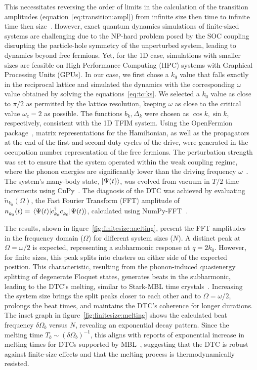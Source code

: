 \documentclass[preprint,5p,times,twocolumn]{elsarticle}
\begin{document}
This necessitates reversing the order of limits in the calculation of the transition amplitudes (equation~\ref{eq:transition:ampl}) from infinite size then time to infinite time then size~\citep{melting:khemani,melt2023}. However, exact quantum dynamics simulations of finite-sized systems are challenging due to the NP-hard problem posed by the SOC coupling disrupting the particle-hole symmetry of the unperturbed system, leading to dynamics beyond free fermions. Yet, for the 1D case, simulations with smaller sizes are feasible on High Performance Computing (HPC) systems with Graphical Processing Units (GPUs). In our case, we first chose a $k_0$ value that falls exactly in the reciprocal lattice and simulated the dynamics with the corresponding $\omega$ value obtained by solving the equations~\ref{eq:tc:ks}. We selected a $k_0$ value as close to $\pi/2$ as permitted by the lattice resolution, keeping $\omega$ as close to the critical value $\omega_c = 2$ as possible. The functions $b_k, \Delta_k$ were chosen as $\cos{k}, \sin{k}$, respectively, consistent with the 1D TFIM system.  Using the OpenFermion package~\citep{openfermion}, matrix representations for the Hamiltonian, as well as the propagators at the end of the first and second duty cycles of the drive, were generated in the occupation number representation of the free fermions. The perturbation strength was set to ensure that the system operated within the weak coupling regime, where the phonon energies are significantly lower than the driving frequency $\omega$~\citep{floquet:pert}. The system's many-body state, $\ket{\Psi(t)}$, was evolved from vacuum in $T/2$ time increments using CuPy~\citep{cupy_learningsys2017}. The diagnosis of the DTC was achieved by evaluating $\widetilde{n}_{k_0}(\Omega)$, the Fast Fourier Transform (FFT) amplitude of $n^{\;}_{k_0}(t)=\expval{c^\dagger_{k_0}c^{\;}_{k_0}}{\Psi(t)}$, calculated using NumPy-FFT~\citep{harris2020array}.

The results, shown in figure~\ref{fig:finitesize:melting}, present the FFT amplitudes in the frequency domain ($\Omega$) for different system sizes ($N$). A distinct peak at $\Omega=\omega/2$ is expected, representing a subharmonic response at $q=2k_0$. However, for finite sizes, this peak splits into clusters on either side of the expected position. This characteristic, resulting from the phonon-induced quasienergy splitting of degenerate Floquet states, generates beats in the subharmonic, leading to the DTC's melting, similar to Stark-MBL time crystals~\citep{melt2023}. Increasing the system size brings the split peaks closer to each other and to $\Omega=\omega/2$, prolongs the beat times, and maintains the DTC's coherence for longer durations. The inset graph in figure~\ref{fig:finitesize:melting} shows the calculated beat frequency $\delta\Omega_b$ versus $N$, revealing an exponential decay pattern. Since the melting time $T_b\sim (\delta\Omega_b)^{-1}$, this aligns with reports of exponential increase in melting times for DTCs supported by MBL~\citep{PhysRevLett.117.090402, melting:khemani, melt2019, melt2020, melt2023}, suggesting that the DTC is robust against finite-size effects and that the melting process is thermodynamically resisted.
\end{document}
